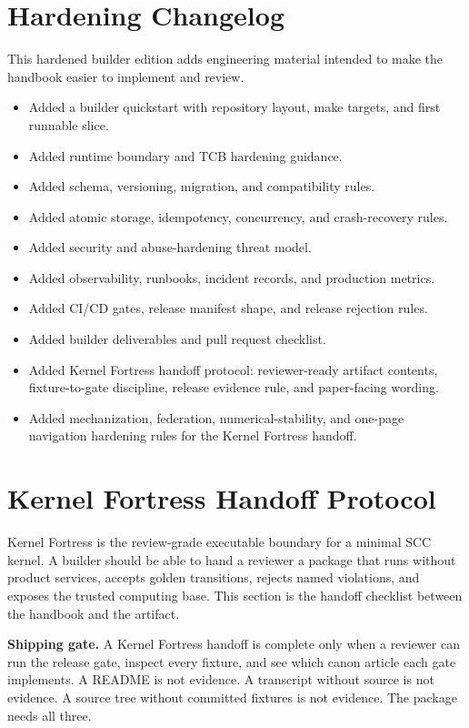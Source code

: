 \documentclass[11pt,oneside]{article}
\newenvironment{shipbox}{\begin{shaded}\noindent\textbf{Shipping gate.} }{\end{shaded}}
\begin{document}
\section{Hardening Changelog}
This hardened builder edition adds engineering material intended to make the handbook easier to implement and review.

\begin{itemize}
\item Added a builder quickstart with repository layout, make targets, and first runnable slice.
\item Added runtime boundary and TCB hardening guidance.
\item Added schema, versioning, migration, and compatibility rules.
\item Added atomic storage, idempotency, concurrency, and crash-recovery rules.
\item Added security and abuse-hardening threat model.
\item Added observability, runbooks, incident records, and production metrics.
\item Added CI/CD gates, release manifest shape, and release rejection rules.
\item Added builder deliverables and pull request checklist.
\item Added Kernel Fortress handoff protocol: reviewer-ready artifact contents, fixture-to-gate discipline, release evidence rule, and paper-facing wording.
\item Added mechanization, federation, numerical-stability, and one-page navigation hardening rules for the Kernel Fortress handoff.
\end{itemize}



\section{Kernel Fortress Handoff Protocol}
Kernel Fortress is the review-grade executable boundary for a minimal SCC kernel. A builder should be able to hand a reviewer a package that runs without product services, accepts golden transitions, rejects named violations, and exposes the trusted computing base. This section is the handoff checklist between the handbook and the artifact.

\begin{shipbox}
A Kernel Fortress handoff is complete only when a reviewer can run the release gate, inspect every fixture, and see which canon article each gate implements. A README is not evidence. A transcript without source is not evidence. A source tree without committed fixtures is not evidence. The package needs all three.
\end{shipbox}
\end{document}

